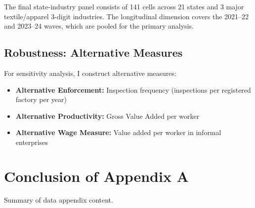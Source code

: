 The final state-industry panel consists of 141 cells across 21 states and 3 major textile/apparel 3-digit industries. The longitudinal dimension covers the 2021--22 and 2023--24 waves, which are pooled for the primary analysis.

\subsection{Robustness: Alternative Measures}

For sensitivity analysis, I construct alternative measures:

\begin{itemize}
	\item \textbf{Alternative Enforcement:} Inspection frequency (inspections per registered factory per year)
	\item \textbf{Alternative Productivity:} Gross Value Added per worker
	\item \textbf{Alternative Wage Measure:} Value added per worker in informal enterprises
\end{itemize}

\section{Conclusion of Appendix A}

Summary of data appendix content.


